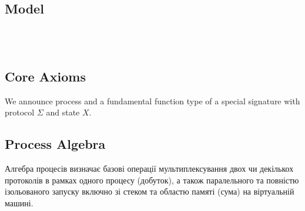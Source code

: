 \documentclass[11pt,oneside]{article}
\begin{document}
   \subsection{Model}

\begin{lstlisting}

   
\end{lstlisting}

  \subsection*{Core Axioms}
  We announce process and a fundamental function type of a special signature with protocol $\Sigma$ and
  state $X$.

\begin{prooftree}
\end{prooftree}

\begin{prooftree}
\end{prooftree}

\begin{prooftree}
\end{prooftree}

\paragraph{}

  \subsection*{Process Algebra}

  Алгебра процесів визначає базові операції мультиплексування двох чи декількох
  протоколів в рамках одного процесу (добуток), а також паралельного та повністю
  ізольованого запуску включно зі стеком та областю памяті (сума) на
  віртуальній машині.
\end{document}
